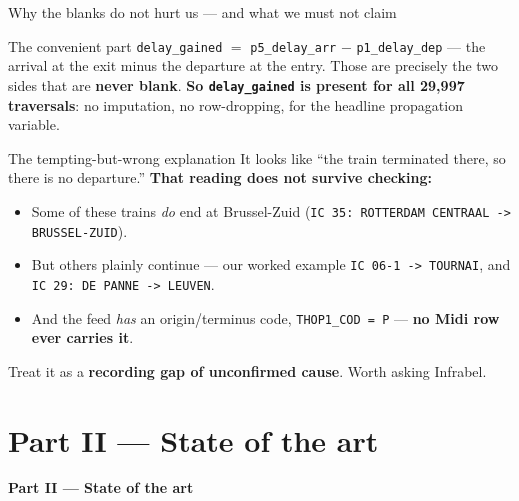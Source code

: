 \documentclass[aspectratio=169,10pt]{beamer}
\newcommand{\hl}[1]{{\color{corange}\textbf{#1}}}
\begin{document}
\begin{frame}{Why the blanks do not hurt us --- and what we must not claim}
  \begin{block}{\small The convenient part}
    \small \texttt{delay\_gained} $=$ \texttt{p5\_delay\_arr} $-$ \texttt{p1\_delay\_dep}
    --- the arrival at the exit minus the departure at the entry. Those are precisely the
    two sides that are \textbf{never blank}. \hl{So \texttt{delay\_gained} is present for
    all 29{,}997 traversals}: no imputation, no row-dropping, for the headline propagation
    variable.
  \end{block}

  \vspace{0.6em}
  \begin{alertblock}{\small The tempting-but-wrong explanation}
    \small It looks like ``the train terminated there, so there is no departure.''
    \textbf{That reading does not survive checking:}
    \begin{itemize}\small
      \item Some of these trains \emph{do} end at Brussel-Zuid
        (\texttt{IC 35: ROTTERDAM CENTRAAL -> BRUSSEL-ZUID}).
      \item But others plainly continue --- our worked example
        \texttt{IC 06-1 -> TOURNAI}, and \texttt{IC 29: DE PANNE -> LEUVEN}.
      \item And the feed \emph{has} an origin/terminus code, \texttt{THOP1\_COD = P} ---
        \textbf{no Midi row ever carries it}.
    \end{itemize}
  \end{alertblock}

  \vspace{0.4em}
  \centering
  Treat it as a \textbf{recording gap of unconfirmed cause}. Worth asking Infrabel.
\end{frame}

\section{Part II --- State of the art}
\begin{frame}[plain]
  \begin{center}\Large\textbf{Part II --- State of the art}\end{center}
\end{frame}
\end{document}
